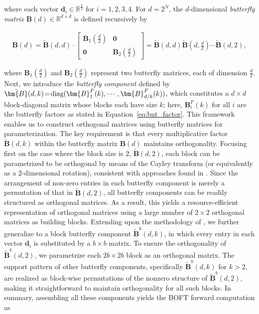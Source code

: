 where each vector $\bm{d}_i \in \mathbb{R}^{\frac{k}{2}}$ for $i=1,2,3,4$. For $d=2^N$, the $d$-dimensional \emph{butterfly matrix} $\bm{B}(d)\in\mathbb{R}^{d\times d}$ is defined recursively by

\begin{equation}
\begin{aligned}
    \!\!\bm{B}(d)=\tilde{\bm{B}}(d,d)\!\cdot\!\begin{bmatrix}
    \bm{B}_1(\frac{d}{2})\!\!\!\!\! & \bm{0} \\
    \bm{0}\!\!\!\!\! &\bm{B}_2(\frac{d}{2})
    \end{bmatrix}= \tilde{\bm{B}}(d,d)\tilde{\bm{B}}(d,\frac{d}{2})\cdots\tilde{\bm{B}}(d,2),
\end{aligned}
\end{equation}

where $\bm{B}_1(\frac{d}{2})$ and $\bm{B}_2(\frac{d}{2})$ represent two butterfly matrices, each of dimension $\frac{d}{2}$. Next, we introduce the \emph{butterfly component} defined by $\thickmuskip=2mu \medmuskip=2mu \tilde{\bm{B}}(d,k)=\text{diag}(\bm{B}^F_1(k),\cdots,\bm{B}^F_{d/k}(k))$, which constitutes a $d\times d$ block-diagonal matrix whose blocks each have size $k$; here, $\bm{B}^F_i(k)$ for all $i$ are the butterfly factors as stated in Equation~\ref{eq:but_factor}. This framework enables us to construct orthogonal matrices using butterfly matrices for parameterization. The key requirement is that every multiplicative factor $\tilde{\bm{B}}(d,k)$ within the butterfly matrix $\bm{B}(d)$ maintains orthogonality. Focusing first on the case where the block size is $2$, $\tilde{\bm{B}}(d,2)$, each block can be parametrized to be orthogonal by means of the Cayley transform (or equivalently as a $2$-dimensional rotation), consistent with approaches found in \cite{liu2021orthogonal,qiu2023controlling}. Since the arrangement of non-zero entries in each butterfly component is merely a permutation of that in $\tilde{\bm{B}}(d,2)$, all butterfly components can be readily structured as orthogonal matrices. As a result, this yields a resource-efficient representation of orthogonal matrices using a large number of $2\times 2$ orthogonal matrices as building blocks. Extending upon the methodology of \cite{chen2022pixelated}, we further generalize to a block butterfly component $\tilde{\bm{B}}^b(d,k)$, in which every entry in each vector $\bm{d}_i$ is substituted by a $b\times b$ matrix. To ensure the orthogonality of $\tilde{\bm{B}}^b(d,2)$, we parametrize each $2b\times 2b$ block as an orthogonal matrix. The support pattern of other butterfly components, specifically $\tilde{\bm{B}}^b(d,k)$ for $k>2$, are realized as block-wise permutations of the nonzero structure of $\tilde{\bm{B}}^b(d,2)$, making it straightforward to maintain orthogonality for all such blocks. In summary, assembling all these components yields the BOFT forward computation as

